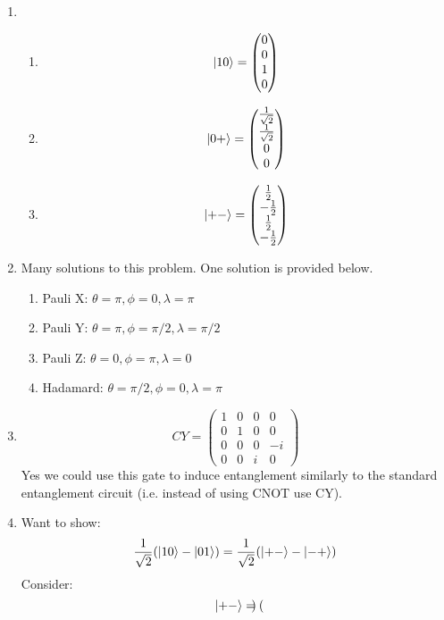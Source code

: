 \documentclass[12pt]{article}
\begin{document}
\begin{enumerate}[font=\bfseries]
    \item \begin{enumerate}
            \item \[\ket{10} = \begin{pmatrix} 0 \\ 0 \\ 1 \\0          \end{pmatrix}\]
            \item \[\ket{0+} = \begin{pmatrix} \frac{1}{\sqrt{2}} \\ \frac{1}{\sqrt{2}} \\ 0 \\0          \end{pmatrix}\]
            \item \[\ket{+-} = \begin{pmatrix} \frac{1}{2} \\ -\frac{1}{2} \\ \frac{1}{2} \\ -\frac{1}{2}         \end{pmatrix}\]
        \end{enumerate}
    \item Many solutions to this problem. One solution is provided below.
        \begin{enumerate}
            \item Pauli X: $\theta=\pi,\phi=0,\lambda=\pi$
            \item Pauli Y: $\theta=\pi,\phi=\pi/2,\lambda=\pi/2$
            \item Pauli Z: $\theta=0,\phi=\pi,\lambda=0$
            \item Hadamard: $\theta=\pi/2,\phi=0,\lambda=\pi$
        \end{enumerate}
    \item 
        \[CY = \begin{pmatrix} 
        1 & 0 & 0 & 0 \\
        0 & 1 & 0 & 0 \\
        0 & 0 & 0 & -i \\
        0 & 0 & i & 0
        \end{pmatrix} \]
        Yes we could use this gate to induce entanglement similarly to the standard entanglement circuit (i.e. instead of using CNOT use CY).
    \item Want to show:
    \[\frac{1}{\sqrt{2}}(\ket{10} - \ket{01}) = \frac{1}{\sqrt{2}}(\ket{+-} - \ket{-+})\]
    Consider:
    \[\ket{+-} = \begin{pmatrix}

\end{pmatrix}\]
\end{enumerate}
\end{document}
